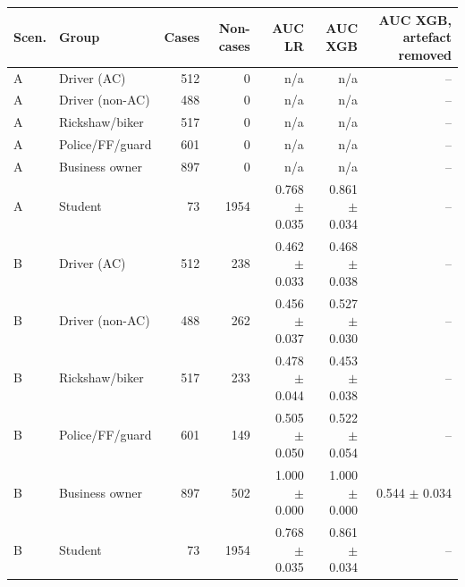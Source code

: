 \begin{tabular}{llrrrrr}
\toprule
Scen. & Group & Cases & Non-cases & AUC LR & AUC XGB & AUC XGB, artefact removed \\
\midrule
A & Driver (AC) & 512 & 0 & n/a & n/a & -- \\
A & Driver (non-AC) & 488 & 0 & n/a & n/a & -- \\
A & Rickshaw/biker & 517 & 0 & n/a & n/a & -- \\
A & Police/FF/guard & 601 & 0 & n/a & n/a & -- \\
A & Business owner & 897 & 0 & n/a & n/a & -- \\
A & Student & 73 & 1954 & 0.768 $\pm$ 0.035 & 0.861 $\pm$ 0.034 & -- \\
\midrule
B & Driver (AC) & 512 & 238 & 0.462 $\pm$ 0.033 & 0.468 $\pm$ 0.038 & -- \\
B & Driver (non-AC) & 488 & 262 & 0.456 $\pm$ 0.037 & 0.527 $\pm$ 0.030 & -- \\
B & Rickshaw/biker & 517 & 233 & 0.478 $\pm$ 0.044 & 0.453 $\pm$ 0.038 & -- \\
B & Police/FF/guard & 601 & 149 & 0.505 $\pm$ 0.050 & 0.522 $\pm$ 0.054 & -- \\
B & Business owner & 897 & 502 & 1.000 $\pm$ 0.000 & 1.000 $\pm$ 0.000 & 0.544 $\pm$ 0.034 \\
B & Student & 73 & 1954 & 0.768 $\pm$ 0.035 & 0.861 $\pm$ 0.034 & -- \\
\bottomrule
\end{tabular}
